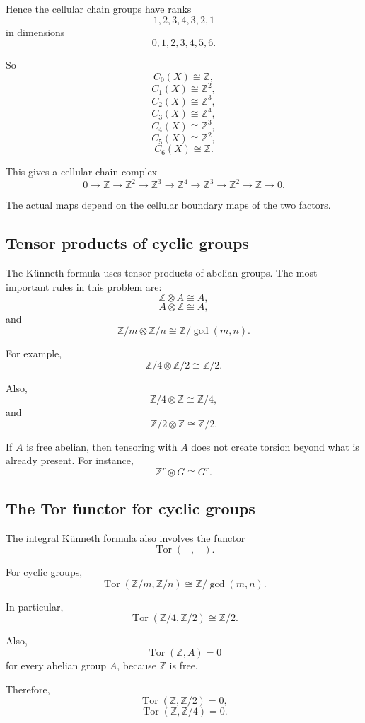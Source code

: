 \documentclass[12pt,a4paper]{article}
\theoremstyle{notespace}
\begin{document}
Hence the cellular chain groups have ranks
\[
1,2,3,4,3,2,1
\]
in dimensions
\[
0,1,2,3,4,5,6.
\]

So
\[
C_0(X)\cong \mathbb Z,
\]
\[
C_1(X)\cong \mathbb Z^2,
\]
\[
C_2(X)\cong \mathbb Z^3,
\]
\[
C_3(X)\cong \mathbb Z^4,
\]
\[
C_4(X)\cong \mathbb Z^3,
\]
\[
C_5(X)\cong \mathbb Z^2,
\]
\[
C_6(X)\cong \mathbb Z.
\]

This gives a cellular chain complex
\[
0
\longrightarrow
\mathbb Z
\longrightarrow
\mathbb Z^2
\longrightarrow
\mathbb Z^3
\longrightarrow
\mathbb Z^4
\longrightarrow
\mathbb Z^3
\longrightarrow
\mathbb Z^2
\longrightarrow
\mathbb Z
\longrightarrow
0.
\]

The actual maps depend on the cellular boundary maps of the two factors.

\subsection{Tensor products of cyclic groups}

The Künneth formula uses tensor products of abelian groups. The most important rules in this problem are:
\[
\mathbb Z\otimes A\cong A,
\]
\[
A\otimes \mathbb Z\cong A,
\]
and
\[
\mathbb Z/m\otimes \mathbb Z/n
\cong
\mathbb Z/\gcd(m,n).
\]

For example,
\[
\mathbb Z/4\otimes \mathbb Z/2
\cong
\mathbb Z/2.
\]

Also,
\[
\mathbb Z/4\otimes \mathbb Z
\cong
\mathbb Z/4,
\]
and
\[
\mathbb Z/2\otimes \mathbb Z
\cong
\mathbb Z/2.
\]

If \(A\) is free abelian, then tensoring with \(A\) does not create torsion beyond what is already present. For instance,
\[
\mathbb Z^r\otimes G\cong G^r.
\]

\subsection{The Tor functor for cyclic groups}

The integral Künneth formula also involves the functor
\[
\operatorname{Tor}(-,-).
\]

For cyclic groups,
\[
\operatorname{Tor}(\mathbb Z/m,\mathbb Z/n)
\cong
\mathbb Z/\gcd(m,n).
\]

In particular,
\[
\operatorname{Tor}(\mathbb Z/4,\mathbb Z/2)
\cong
\mathbb Z/2.
\]

Also,
\[
\operatorname{Tor}(\mathbb Z,A)=0
\]
for every abelian group \(A\), because \(\mathbb Z\) is free.

Therefore,
\[
\operatorname{Tor}(\mathbb Z,\mathbb Z/2)=0,
\]
\[
\operatorname{Tor}(\mathbb Z,\mathbb Z/4)=0.
\]
\end{document}
